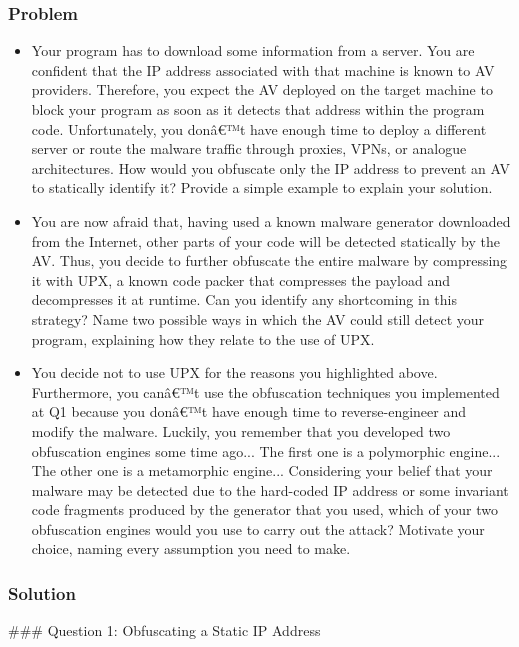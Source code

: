 \documentclass{article}
\begin{document}
\subsubsection*{Problem}
\begin{itemize}
    \item[\textbf{1.}] [2 points] Your program has to download some information from a server. You are confident that the IP address associated with that machine is known to AV providers. Therefore, you expect the AV deployed on the target machine to block your program as soon as it detects that address within the program code. Unfortunately, you donâ€™t have enough time to deploy a different server or route the malware traffic through proxies, VPNs, or analogue architectures. How would you obfuscate only the IP address to prevent an AV to statically identify it? Provide a simple example to explain your solution.

    \item[\textbf{2.}] [2 points] You are now afraid that, having used a known malware generator downloaded from the Internet, other parts of your code will be detected statically by the AV. Thus, you decide to further obfuscate the entire malware by compressing it with UPX, a known code packer that compresses the payload and decompresses it at runtime. Can you identify any shortcoming in this strategy? Name two possible ways in which the AV could still detect your program, explaining how they relate to the use of UPX.

    \item[\textbf{3.}] [2 points] You decide not to use UPX for the reasons you highlighted above. Furthermore, you canâ€™t use the obfuscation techniques you implemented at Q1 because you donâ€™t have enough time to reverse-engineer and modify the malware. Luckily, you remember that you developed two obfuscation engines some time ago... The first one is a polymorphic engine... The other one is a metamorphic engine... Considering your belief that your malware may be detected due to the hard-coded IP address or some invariant code fragments produced by the generator that you used, which of your two obfuscation engines would you use to carry out the attack? Motivate your choice, naming every assumption you need to make.
\end{itemize}

\subsubsection*{Solution}
\#\#\# Question 1: Obfuscating a Static IP Address
\end{document}
